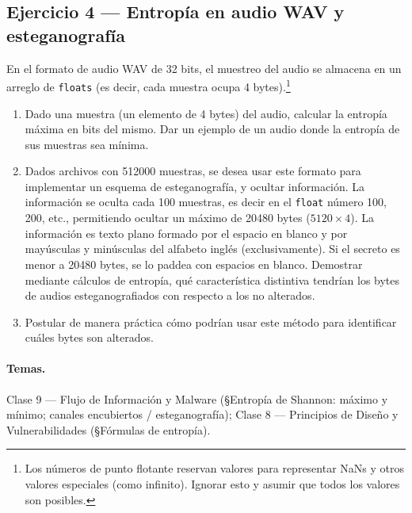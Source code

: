 \subsection{Ejercicio 4 — Entropía en audio WAV y esteganografía}

\begin{consigna}
En el formato de audio WAV de 32 bits, el muestreo del audio se almacena en un arreglo de
\texttt{floats} (es decir, cada muestra ocupa 4 bytes).\footnote{Los números de punto flotante
reservan valores para representar NaNs y otros valores especiales (como infinito). Ignorar esto
y asumir que todos los valores son posibles.}
\begin{enumerate}[label=\alph*)]
  \item Dado una muestra (un elemento de 4 bytes) del audio, calcular la entropía máxima en bits
        del mismo. Dar un ejemplo de un audio donde la entropía de sus muestras sea mínima.
  \item Dados archivos con 512000 muestras, se desea usar este formato para implementar un
        esquema de esteganografía, y ocultar información. La información se oculta cada 100
        muestras, es decir en el \texttt{float} número 100, 200, etc., permitiendo ocultar un
        máximo de 20480 bytes ($5120 \times 4$). La información es texto plano formado por el
        espacio en blanco y por mayúsculas y minúsculas del alfabeto inglés (exclusivamente). Si
        el secreto es menor a 20480 bytes, se lo paddea con espacios en blanco.
        Demostrar mediante cálculos de entropía, qué característica distintiva tendrían los bytes
        de audios esteganografiados con respecto a los no alterados.
  \item Postular de manera práctica cómo podrían usar este método para identificar cuáles bytes
        son alterados.
\end{enumerate}
\end{consigna}

\paragraph{Temas.} Clase 9 — Flujo de Información y Malware (\S Entropía de Shannon: máximo y
mínimo; canales encubiertos / esteganografía); Clase 8 — Principios de Diseño y Vulnerabilidades
(\S Fórmulas de entropía).

